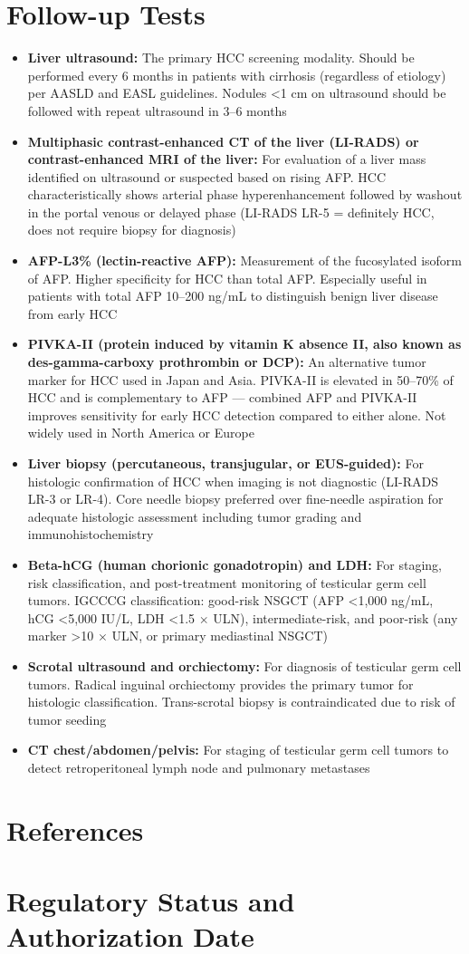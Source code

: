 \section*{Follow-up Tests}
\begin{itemize}
  \item \textbf{Liver ultrasound:} The primary HCC screening modality. Should be performed every 6 months in patients with cirrhosis (regardless of etiology) per AASLD and EASL guidelines. Nodules <1 cm on ultrasound should be followed with repeat ultrasound in 3--6 months
  \item \textbf{Multiphasic contrast-enhanced CT of the liver (LI-RADS) or contrast-enhanced MRI of the liver:} For evaluation of a liver mass identified on ultrasound or suspected based on rising AFP. HCC characteristically shows arterial phase hyperenhancement followed by washout in the portal venous or delayed phase (LI-RADS LR-5 = definitely HCC, does not require biopsy for diagnosis)
  \item \textbf{AFP-L3\% (lectin-reactive AFP):} Measurement of the fucosylated isoform of AFP. Higher specificity for HCC than total AFP. Especially useful in patients with total AFP 10--200 ng/mL to distinguish benign liver disease from early HCC
  \item \textbf{PIVKA-II (protein induced by vitamin K absence II, also known as des-gamma-carboxy prothrombin or DCP):} An alternative tumor marker for HCC used in Japan and Asia. PIVKA-II is elevated in 50--70\% of HCC and is complementary to AFP --- combined AFP and PIVKA-II improves sensitivity for early HCC detection compared to either alone. Not widely used in North America or Europe
  \item \textbf{Liver biopsy (percutaneous, transjugular, or EUS-guided):} For histologic confirmation of HCC when imaging is not diagnostic (LI-RADS LR-3 or LR-4). Core needle biopsy preferred over fine-needle aspiration for adequate histologic assessment including tumor grading and immunohistochemistry
  \item \textbf{Beta-hCG (human chorionic gonadotropin) and LDH:} For staging, risk classification, and post-treatment monitoring of testicular germ cell tumors. IGCCCG classification: good-risk NSGCT (AFP <1,000 ng/mL, hCG <5,000 IU/L, LDH <1.5 $\times$ ULN), intermediate-risk, and poor-risk (any marker >10 $\times$ ULN, or primary mediastinal NSGCT)
  \item \textbf{Scrotal ultrasound and orchiectomy:} For diagnosis of testicular germ cell tumors. Radical inguinal orchiectomy provides the primary tumor for histologic classification. Trans-scrotal biopsy is contraindicated due to risk of tumor seeding
  \item \textbf{CT chest/abdomen/pelvis:} For staging of testicular germ cell tumors to detect retroperitoneal lymph node and pulmonary metastases
\end{itemize}

\section*{References}



\clearpage
\section*{Regulatory Status and Authorization Date}

\clearpage
